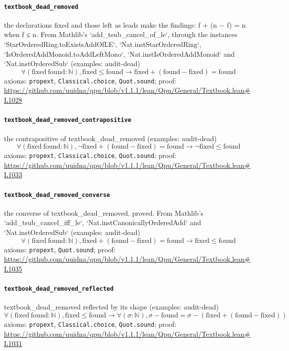 \documentclass[11pt]{article}
\begin{document}
\paragraph{\texttt{textbook\_dead\_removed}}
the declarations fixed and those left as leads make the findings: f + (n − f) = n when f ≤ n. From Mathlib's `add\_tsub\_cancel\_of\_le`, through the instances `StarOrderedRing.toExistsAddOfLE`, `Nat.instStarOrderedRing`, `IsOrderedAddMonoid.toAddLeftMono`, `Nat.instIsOrderedAddMonoid` and `Nat.instOrderedSub` (examples: audit-dead)
\[ \forall (\mathrm{fixed}\ \mathrm{found} : \mathbb{N}), \mathrm{fixed} \le \mathrm{found} \to \mathrm{fixed} + (\mathrm{found} - \mathrm{fixed}) = \mathrm{found} \]
\noindent axioms: \texttt{propext}, \texttt{Classical.choice}, \texttt{Quot.sound}; proof: \url{https://github.com/uuidna/qpu/blob/v1.1.1/lean/Qpu/General/Textbook.lean\#L1028}

\paragraph{\texttt{textbook\_dead\_removed\_contrapositive}}
the contrapositive of textbook\_dead\_removed (examples: audit-dead)
\[ \forall (\mathrm{fixed}\ \mathrm{found} : \mathbb{N}), \neg \mathrm{fixed} + (\mathrm{found} - \mathrm{fixed}) = \mathrm{found} \to \neg \mathrm{fixed} \le \mathrm{found} \]
\noindent axioms: \texttt{propext}, \texttt{Classical.choice}, \texttt{Quot.sound}; proof: \url{https://github.com/uuidna/qpu/blob/v1.1.1/lean/Qpu/General/Textbook.lean\#L1033}

\paragraph{\texttt{textbook\_dead\_removed\_converse}}
the converse of textbook\_dead\_removed, proved. From Mathlib's `add\_tsub\_cancel\_iff\_le`, `Nat.instCanonicallyOrderedAdd` and `Nat.instOrderedSub` (examples: audit-dead)
\[ \forall (\mathrm{fixed}\ \mathrm{found} : \mathbb{N}), \mathrm{fixed} + (\mathrm{found} - \mathrm{fixed}) = \mathrm{found} \to \mathrm{fixed} \le \mathrm{found} \]
\noindent axioms: \texttt{propext}, \texttt{Quot.sound}; proof: \url{https://github.com/uuidna/qpu/blob/v1.1.1/lean/Qpu/General/Textbook.lean\#L1035}

\paragraph{\texttt{textbook\_dead\_removed\_reflected}}
textbook\_dead\_removed reflected by its shape (examples: audit-dead)
\[ \forall (\mathrm{fixed}\ \mathrm{found} : \mathbb{N}), \mathrm{fixed} \le \mathrm{found} \to \forall (\sigma : \mathbb{N}), \sigma - \mathrm{found} = \sigma - (\mathrm{fixed} + (\mathrm{found} - \mathrm{fixed})) \]
\noindent axioms: \texttt{propext}, \texttt{Classical.choice}, \texttt{Quot.sound}; proof: \url{https://github.com/uuidna/qpu/blob/v1.1.1/lean/Qpu/General/Textbook.lean\#L1031}
\end{document}
